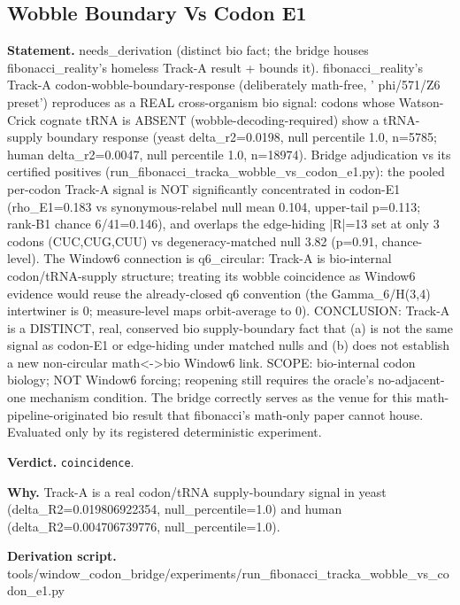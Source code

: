 \subsection{Wobble Boundary Vs Codon E1}\label{sec:bridge-wobble-boundary-vs-codon-e1}
\textbf{Statement.} needs\_derivation (distinct bio fact; the bridge houses fibonacci\_reality's homeless Track-A result
+ bounds it). fibonacci\_reality's Track-A codon-wobble-boundary-response (deliberately math-free, '
phi/571/Z6 preset') reproduces as a REAL cross-organism bio signal: codons whose Watson-Crick
cognate tRNA is ABSENT (wobble-decoding-required) show a tRNA-supply boundary response (yeast
delta\_r2=0.0198, null percentile 1.0, n=5785; human delta\_r2=0.0047, null percentile 1.0,
n=18974). Bridge adjudication vs its certified positives
(run\_fibonacci\_tracka\_wobble\_vs\_codon\_e1.py): the pooled per-codon Track-A signal is NOT
significantly concentrated in codon-E1 (rho\_E1=0.183 vs synonymous-relabel null mean 0.104,
upper-tail p=0.113; rank-B1 chance 6/41=0.146), and overlaps the edge-hiding |R|=13 set at only 3
codons (CUC,CUG,CUU) vs degeneracy-matched null 3.82 (p=0.91, chance-level). The Window6 connection
is q6\_circular: Track-A is bio-internal codon/tRNA-supply structure; treating its wobble
coincidence as Window6 evidence would reuse the already-closed q6 convention (the Gamma\_6/H(3,4)
intertwiner is 0; measure-level maps orbit-average to 0). CONCLUSION: Track-A is a DISTINCT, real,
conserved bio supply-boundary fact that (a) is not the same signal as codon-E1 or edge-hiding under
matched nulls and (b) does not establish a new non-circular math<->bio Window6 link. SCOPE:
bio-internal codon biology; NOT Window6 forcing; reopening still requires the oracle's
no-adjacent-one mechanism condition. The bridge correctly serves as the venue for this
math-pipeline-originated bio result that fibonacci's math-only paper cannot house. Evaluated only by
its registered deterministic experiment.

\textbf{Verdict.} \texttt{coincidence}.

\textbf{Why.} Track-A is a real codon/tRNA supply-boundary signal in yeast (delta\_R2=0.019806922354,
null\_percentile=1.0) and human (delta\_R2=0.004706739776, null\_percentile=1.0).

\textbf{Derivation script.} tools/window\_codon\_bridge/experiments/run\_fibonacci\_tracka\_wobble\_vs\_codon\_e1.py

